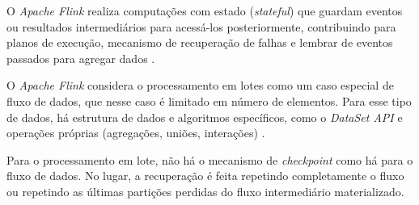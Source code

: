 O \emph{Apache Flink} realiza computações com estado (\emph{stateful}) que guardam
eventos ou resultados intermediários para acessá-los posteriormente,
contribuindo para planos de execução, mecanismo de recuperação de falhas e
lembrar de eventos passados para agregar dados \cite{ApacheFlink2020, Carbone2015}.


O \emph{Apache Flink} considera o processamento em lotes como um caso especial
de fluxo de dados, que nesse caso é limitado em número de elementos.
Para esse tipo de dados, há estrutura de dados e algoritmos específicos, como o
\emph{DataSet API} e operações próprias (agregações, uniões, interações)
\cite{Carbone2015}.

Para o processamento em lote, não há o mecanismo de \emph{checkpoint} como há
para o fluxo de dados.
No lugar, a recuperação é feita repetindo completamente o fluxo ou repetindo as
últimas partições perdidas do fluxo intermediário materializado.










